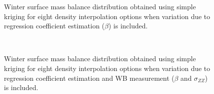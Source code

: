 \documentclass{sfuthesis}
\begin{document}
\begin{appendices}
\begin{figure}
	\caption[]{Winter surface mass balance distribution obtained using simple kriging for eight density interpolation options when variation due to regression coefficient estimation ($\beta$) is included. }
	\label{fig:WSMB_SK_Distributionbeta}
\end{figure}

\begin{figure}
	\centering
	\\
	\caption[]{Winter surface mass balance distribution obtained using simple kriging for eight density interpolation options when variation due to regression coefficient estimation and WB measurement ($\beta$ and $\sigma_{ZZ}$) is included. }
	\label{fig:WSMB_SK_DistributionbetaNzz}
\end{figure}


\end{appendices}
\end{document}
